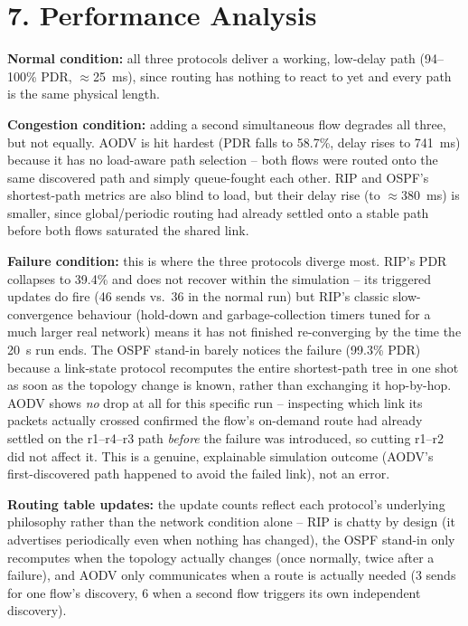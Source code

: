 \documentclass[11pt]{article}
\begin{document}
\section*{7. Performance Analysis}
\textbf{Normal condition:} all three protocols deliver a working, low-delay
path (94--100\% PDR, $\approx$25~ms), since routing has nothing to react to
yet and every path is the same physical length.

\textbf{Congestion condition:} adding a second simultaneous flow degrades all
three, but not equally. AODV is hit hardest (PDR falls to 58.7\%, delay rises
to 741~ms) because it has no load-aware path selection -- both flows were
routed onto the same discovered path and simply queue-fought each other. RIP
and OSPF's shortest-path metrics are also blind to load, but their delay rise
(to $\approx$380~ms) is smaller, since global/periodic routing had already
settled onto a stable path before both flows saturated the shared link.

\textbf{Failure condition:} this is where the three protocols diverge most.
RIP's PDR collapses to 39.4\% and does not recover within the simulation --
its triggered updates do fire (46 sends vs.\ 36 in the normal run) but RIP's
classic slow-convergence behaviour (hold-down and garbage-collection timers
tuned for a much larger real network) means it has not finished
re-converging by the time the 20~s run ends. The OSPF stand-in barely
notices the failure (99.3\% PDR) because a link-state protocol recomputes the
entire shortest-path tree in one shot as soon as the topology change is
known, rather than exchanging it hop-by-hop. AODV shows \emph{no} drop at all
for this specific run -- inspecting which link its packets actually crossed
confirmed the flow's on-demand route had already settled on the r1--r4--r3
path \emph{before} the failure was introduced, so cutting r1--r2 did not
affect it. This is a genuine, explainable simulation outcome (AODV's
first-discovered path happened to avoid the failed link), not an error.

\textbf{Routing table updates:} the update counts reflect each protocol's
underlying philosophy rather than the network condition alone -- RIP is
chatty by design (it advertises periodically even when nothing has changed),
the OSPF stand-in only recomputes when the topology actually changes (once
normally, twice after a failure), and AODV only communicates when a route is
actually needed (3 sends for one flow's discovery, 6 when a second flow
triggers its own independent discovery).
\end{document}
